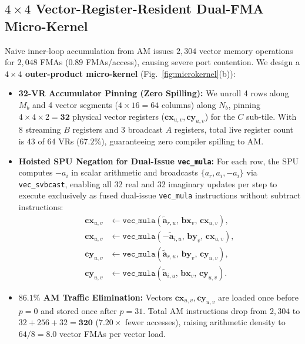 \documentclass[conference]{IEEEtran}
\begin{document}
\subsection{$4 \times 4$ Vector-Register-Resident Dual-FMA Micro-Kernel}
Naive inner-loop accumulation from AM issues $2{,}304$ vector memory operations for $2{,}048$ FMAs ($0.89$ FMAs/access), causing severe port contention. We design a \textbf{$4 \times 4$ outer-product micro-kernel} (Fig.~\ref{fig:microkernel}(b)):
\begin{itemize}\setlength{\itemsep}{0.5pt}\setlength{\parskip}{0pt}
    \item \textbf{32-VR Accumulator Pinning (Zero Spilling):} We unroll 4 rows along $M_b$ and 4 vector segments ($4 \times 16 = 64$ columns) along $N_b$, pinning $4 \times 4 \times 2 = \mathbf{32}$ physical vector registers ($\mathbf{cx}_{u,v}, \mathbf{cy}_{u,v}$) for the $C$ sub-tile. With 8 streaming $B$ registers and 3 broadcast $A$ registers, total live register count is 43 of 64 VRs ($67.2\%$), guaranteeing zero compiler spilling to AM.
    \item \textbf{Hoisted SPU Negation for Dual-Issue \texttt{vec\_mula}:} For each row, the SPU computes $-a_i$ in scalar arithmetic and broadcasts $\{a_r, a_i, -a_i\}$ via \texttt{vec\_svbcast}, enabling all 32 real and 32 imaginary updates per step to execute exclusively as fused dual-issue \texttt{vec\_mula} instructions without subtract instructions:
    \begin{equation}
    \begin{aligned}
    \mathbf{cx}_{u,v} &\leftarrow \texttt{vec\_mula}(\tilde{\mathbf{a}}_{r,u},\, \mathbf{bx}_v,\, \mathbf{cx}_{u,v}), \\
    \mathbf{cx}_{u,v} &\leftarrow \texttt{vec\_mula}(-\tilde{\mathbf{a}}_{i,u},\, \mathbf{by}_v,\, \mathbf{cx}_{u,v}), \\
    \mathbf{cy}_{u,v} &\leftarrow \texttt{vec\_mula}(\tilde{\mathbf{a}}_{r,u},\, \mathbf{by}_v,\, \mathbf{cy}_{u,v}), \\
    \mathbf{cy}_{u,v} &\leftarrow \texttt{vec\_mula}(\tilde{\mathbf{a}}_{i,u},\, \mathbf{bx}_v,\, \mathbf{cy}_{u,v}).
    \end{aligned}
    \label{eq:vec_mula}
    \end{equation}
    \item \textbf{$86.1\%$ AM Traffic Elimination:} Vectors $\mathbf{cx}_{u,v}, \mathbf{cy}_{u,v}$ are loaded once before $p=0$ and stored once after $p=31$. Total AM instructions drop from $2{,}304$ to $32 + 256 + 32 = \mathbf{320}$ ($7.20\times$ fewer accesses), raising arithmetic density to $64 / 8 = \mathbf{8.0}$ vector FMAs per vector load.
\end{itemize}
\end{document}
